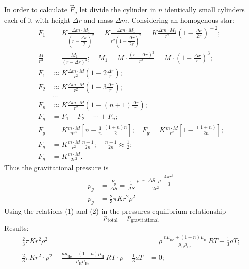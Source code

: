 In order to calculate $\vec{F}_g$ let divide the cylinder in $n$ identically
small cylinders each of it with height $\Delta r$ and mass $\Delta m$.
Considering an homogenous star:
\begin{align*}
  F_1 &= K\frac{\Delta m \cdot M_1}{\left(r - \dfrac{\Delta r}{2}\right)^{2}}
       = K\frac{\Delta m \cdot M_1}{r^2\left(1 - \dfrac{\Delta r}{2r}\right)^{2}}
       = K\frac{\Delta m \cdot M_1}{r^2}\left(1 - \frac{\Delta r}{2r}\right)^{\!-2}; \\
  \frac{M}{r^3} &= \frac{M_1}{(r-\Delta r)^3}; \quad
  M_1 = M\cdot\frac{(r-\Delta r)^3}{r^3} = M\cdot\left(1 - \frac{\Delta r}{r}\right)^{\!3}; \\
  F_1 &\approx K\frac{\Delta m \cdot M}{r^2}\left(1 - 2\frac{\Delta r}{r}\right); \\
  F_2 &\approx K\frac{\Delta m \cdot M}{r^2}\left(1 - 3\frac{\Delta r}{r}\right); \\
  &\dotso \\
  F_n &\approx K\frac{\Delta m \cdot M}{r^2}\left(1 - (n+1)\frac{\Delta r}{r}\right); \\
  F_g &= F_1 + F_2 + \dotsb + F_n; \\
  F_g &= K\frac{m\cdot M}{n r^2}\left[n - \frac{1}{n}\,\frac{(1+n)n}{2}\right]; \quad
  F_g = K\frac{m\cdot M}{r^2}\left[1 - \frac{(1+n)}{2n}\right]; \\
  F_g &= K\frac{m\cdot M}{r^2}\,\frac{n-1}{2n}; \quad
  \frac{n-1}{2n} \approx \frac{1}{2}; \\
  F_g &= K\frac{m\cdot M}{2r^2}. \tag{2}
\end{align*}
Thus the gravitational pressure is
\begin{align*}
  p_g &= \frac{F_g}{\Delta S}
       = \frac{1}{\Delta S}\,
         \frac{\rho\cdot r\cdot\Delta S\cdot\rho\cdot\dfrac{4\pi r^3}{3}}{2r^2} \\
  p_g &= \frac{2}{3}\pi K r^2 \rho^2
\end{align*}
Using the relations (1) and (2) in the pressures equilibrium relationship
\[
  p_{\mathrm{total}} = p_{\mathrm{gravitational}}
\]
Results:
\begin{align*}
  \frac{2}{3}\pi K r^2\rho^2
    &= \rho\,\frac{n\mu_{\mathrm{He}} + (1-n)\mu_{\mathrm{H}}}{\mu_{\mathrm{H}}\mu_{\mathrm{He}}}\,RT
       + \frac{1}{3}aT; \\
  \frac{2}{3}\pi K r^2\cdot\rho^2
    - \frac{n\mu_{\mathrm{He}} + (1-n)\mu_{\mathrm{H}}}{\mu_{\mathrm{H}}\mu_{\mathrm{He}}}\,RT\cdot\rho
    - \frac{1}{3}aT &= 0;
\end{align*}
